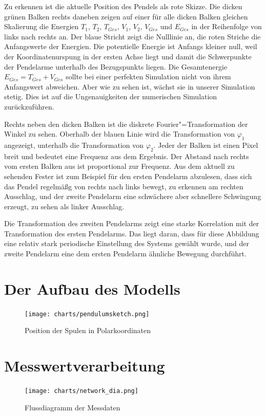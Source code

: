 \documentclass[a4paper, 10pt]{article}
\renewcommand{\phi}{\varphi} %
\begin{document}
Zu erkennen ist die aktuelle Position des Pendels als rote Skizze.
Die dicken grünen Balken rechts daneben zeigen auf einer für alle dicken Balken gleichen Skalierung die Energien $T_1$, $T_2$, $T_{Ges}$, $V_1$, $V_2$, $V_{Ges}$ und $E_{Ges}$ in der Reihenfolge von links nach rechts an.
Der blaue Stricht zeigt die Nulllinie an, die roten Striche die Anfangswerte der Energien.
Die potentielle Energie ist Anfangs kleiner null, weil der Koordinatenurspung in der ersten Achse liegt und damit die Schwerpunkte der Pendelarme unterhalb des Bezugspunkts liegen.
Die Gesamtenergie $E_{Ges} = T_{Ges} + V_{Ges}$ sollte bei einer perfekten Simulation nicht von ihrem Anfangswert abweichen. Aber wie zu sehen ist, wächst sie in unserer Simulation stetig.
Dies ist auf die Ungenauigkeiten der numerischen Simulation zurückzuführen.

Rechts neben den dicken Balken ist die diskrete Fourier"=Transformation der Winkel zu sehen.
Oberhalb der blauen Linie wird die Transformation von $\phi_1$ angezeigt, unterhalb die Transformation von $\phi_2$.
Jeder der Balken ist einen Pixel breit und bedeutet eine Frequenz aus dem Ergebnis.
Der Abstand nach rechts vom ersten Balken aus ist proportional zur Frequenz.
Aus dem aktuell zu sehenden Fester ist zum Beispiel für den ersten Pendelarm abzulesen, dass sich das Pendel regelmäßg von rechts nach links bewegt, zu erkennen am rechten Ausschlag, und der zweite Pendelarm eine schwächere aber schnellere Schwingung erzeugt, zu sehen als linker Ausschlag.

Die Transformation des zweiten Pendelarms zeigt eine starke Korrelation mit der Transformation des ersten Pendelarms. Das liegt daran, dass für diese Abbildung eine relativ stark periodische Einstellung des Systems gewählt wurde, und der zweite Pendelarm eine dem ersten Pendelarm ähnliche Bewegung durchführt.


\section{Der Aufbau des Modells}

\begin{figure}
  \texttt{[image: charts/pendulumsketch.png]}
  \caption{Position der Spulen in Polarkoordinaten}
  \label{fig:pendulumsketch}
\end{figure}



\section{Messwertverarbeitung}
\begin{figure}
  \texttt{[image: charts/network\_dia.png]}
  \caption{Flussdiagramm der Messdaten}
  \label{fig:network}
\end{figure}

\clearpage
{}

{}
\end{document}
